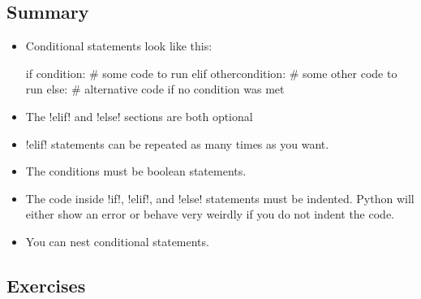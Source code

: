 \documentclass[11pt]{cselabheader}
\begin{document}
\subsection{Summary}

\begin{itemize}
  \item Conditional statements look like this:

    \begin{python3code}
if condition:
    # some code to run
elif othercondition:
    # some other code to run
else:
    # alternative code if no condition was met
    \end{python3code}

  \item The \pythoninline!elif! and \pythoninline!else! sections are both optional
  \item \pythoninline!elif! statements can be repeated as many times as you want.
  \item The conditions must be boolean statements.
  \item The code inside \pythoninline!if!, \pythoninline!elif!, and \pythoninline!else!
    statements must be indented. Python will either show an error or behave very
    weirdly if you do not indent the code.
  \item You can nest conditional statements.
\end{itemize}

\subsection{Exercises}
\label{subsec:ifex}
\end{document}
